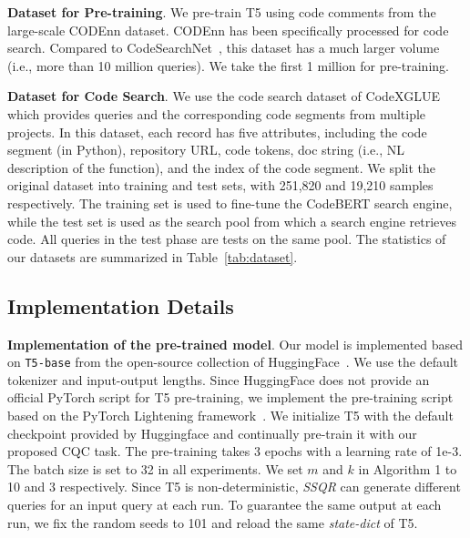 \documentclass[sigconf,screen]{acmart}
\newcommand{\ourmethod}{\textit{SSQR}\xspace}
\newcommand{\wan}[1]{\textcolor{cyan!70!blue}{[Wan: #1]}}
\begin{document}
\smallskip\textbf{Dataset for Pre-training}. We pre-train T5 using code comments from the large-scale CODEnn dataset. CODEnn has been specifically processed for code search. %
Compared to CodeSearchNet~\cite{CodeSearchNet}, this dataset has a much larger volume (i.e., more than 10 million queries). We take the first 1 million for pre-training.

\smallskip\textbf{Dataset for Code Search}. We use the code search dataset of CodeXGLUE which provides queries and the corresponding code segments from multiple projects. %
In this dataset, each record has five attributes, including the code segment (in Python), repository URL, code tokens, doc string (i.e., NL description of the function), and the index of the code segment. 
We split the original dataset into training and test sets, with 251,820 and 19,210 samples respectively.
The training set is used to fine-tune the CodeBERT search engine, while the test set is used as the search pool from which a search engine retrieves code. All queries in the test phase are tests on the same pool.
The statistics of our datasets are summarized in Table~\ref{tab:dataset}.




\subsection{Implementation Details}
\textbf{Implementation of the pre-trained model}. Our model is implemented based on \verb|T5-base| from the open-source collection of HuggingFace~\cite{t5base}. We use the default tokenizer and input-output lengths.
Since HuggingFace does not provide an official PyTorch script for T5 pre-training, we implement the pre-training script based on the PyTorch Lightening framework~\cite{PyTorch-Lightning}. We initialize T5 with the default checkpoint provided by Huggingface and continually pre-train it with our proposed CQC task. The pre-training takes 3 epochs with a learning rate of 1e-3. The batch size is set to 32 in all experiments. We set $m$ and $k$ in Algorithm 1 to 10 and 3 respectively.
Since T5 is non-deterministic, \ourmethod can generate different queries for an input query at each run. To guarantee the same output at each run, we fix the random seeds to 101 and reload the same \emph{state-dict} of T5.
\end{document}
